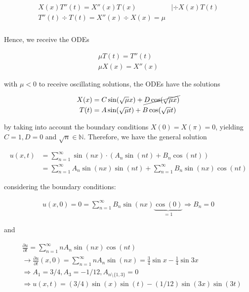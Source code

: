 \begin{align*}
    \begin{matrix}
        X(x)T''(t)=X''(x)T(x) & |\div X(x)T(t) \\
        T''(t)\div T(t) = X''(x)\div X(x) = \mu
    \end{matrix} \\
\end{align*}

Hence, we receive the ODEs

\begin{align*}
    \mu T(t) = T''(t) \\
    \mu X(x) = X''(x)
\end{align*}

with $\mu < 0$ to receive oscillating solutions, the ODEs have the solutions

\begin{align*}
    X(x) & = C \sin(\sqrt\mu x)+\cancel{ D\cos(\sqrt\mu x) } \\
    T(t) & = A \sin(\sqrt\mu t)+B \cos(\sqrt\mu t)
\end{align*}

by taking into account the boundary conditions $X(0)=X(\pi)=0$, yielding $C=1,D=0$ and $\sqrt{n}\in\mathbb{N}$.
Therefore, we have the general solution

\begin{align*}
    u(x,t) & = \sum_{n=1}^\infty \sin(nx)\cdot\left( A_n\sin(nt)+B_n\cos(nt) \right) \\
    \ & = \sum_{n=1}^\infty A_n\sin(nx)\sin(nt) + \sum_{n=1}^\infty B_n\sin(nx)\cos(nt)
\end{align*}

considering the boundary conditions:

\begin{align*}
    u(x,0) = 0 = \sum_{n=1}^\infty B_n\sin(nx)\underbrace{\cos(0)}_{=1} \Rightarrow B_n=0
\end{align*}

and

\begin{align*}
    \ & \frac{\partial u}{\partial t} = \sum_{n=1}^\infty nA_n\sin(nx)\cos(nt)\\
    \ & \rightarrow \frac{\partial u}{\partial t}(x,0) = \sum_{n=1}^\infty nA_n\sin(nx) = \frac{3}{4}\sin x-\frac{1}{4}\sin 3x \\
    \ & \Rightarrow A_1=3/4, A_3=-1/12, A_{n\setminus \{1,3\}}=0 \\
    \ & \Rightarrow u(x,t)=(3/4)\sin(x)\sin(t)-(1/12)\sin(3x)\sin(3t)
\end{align*}
